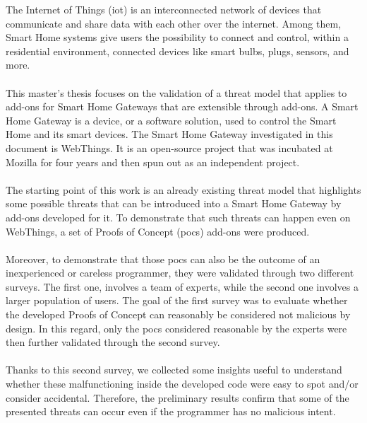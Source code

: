 The Internet of Things (\gls{iot}) is an interconnected network of devices that communicate and share data with each other over the internet. Among them, Smart Home systems give users the possibility to connect and control, within a residential environment, connected devices like smart bulbs, plugs, sensors, and more.\\
\\
This master’s thesis focuses on the validation of a threat model that applies to add-ons for Smart Home Gateways that are extensible through add-ons. A Smart Home Gateway is a device, or a software solution, used to control the Smart Home and its smart devices. The Smart Home Gateway investigated in this document is WebThings. It is an open-source project that was incubated at Mozilla for four years and then spun out as an independent project.\\
\\
The starting point of this work is an already existing threat model that highlights some possible threats that can be introduced into a Smart Home Gateway by add-ons developed for it. To demonstrate that such threats can happen even on WebThings, a set of Proofs of Concept (\glspl{poc}) add-ons were produced.\\
\\
Moreover, to demonstrate that those \glspl{poc} can also be the outcome of an inexperienced or careless programmer, they were validated through two different surveys.  The first one, involves a team of experts, while the second one involves a larger population of users. The goal of the first survey was to evaluate whether the developed Proofs of Concept can reasonably be considered not malicious by design. In this regard, only the \glspl{poc} considered reasonable by the experts were then further validated through the second survey.\\
\\
Thanks to this second survey, we collected some insights useful to understand whether these malfunctioning inside the developed code were easy to spot and/or consider accidental.
Therefore, the preliminary results confirm that some of the presented threats can occur even if the programmer has no malicious intent.
